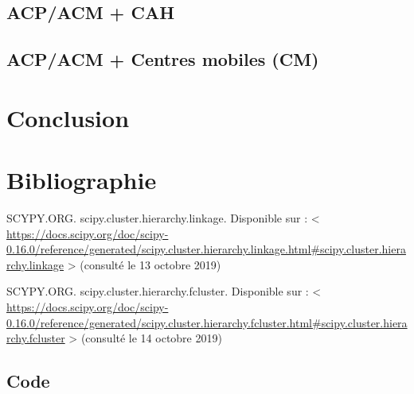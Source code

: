 \documentclass{rapportECL}
\begin{document}
\subsection{ACP/ACM + CAH}


\subsection{ACP/ACM + Centres mobiles (CM)}


\section{Conclusion}


\section{Bibliographie}

SCYPY.ORG. scipy.cluster.hierarchy.linkage. Disponible sur : < \url{https://docs.scipy.org/doc/scipy-0.16.0/reference/generated/scipy.cluster.hierarchy.linkage.html#scipy.cluster.hierarchy.linkage} > (consulté le 13 octobre 2019)\newline

SCYPY.ORG. scipy.cluster.hierarchy.fcluster. Disponible sur : < \url{https://docs.scipy.org/doc/scipy-0.16.0/reference/generated/scipy.cluster.hierarchy.fcluster.html#scipy.cluster.hierarchy.fcluster} > (consulté le 14 octobre 2019)\newline


\newpage
\subsection{Code}



\end{document}
